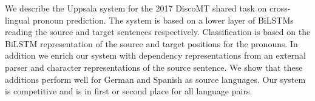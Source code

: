 We describe the Uppsala system for the 2017 DiscoMT shared task on cross-lingual pronoun prediction. The system is based on a lower layer of BiLSTMs reading the source and target sentences respectively. Classification is based on the BiLSTM representation of the source and target positions for the pronouns. In addition we enrich our system with dependency representations from an external parser and character representations of the source sentence. We show that these additions perform well for German and Spanish as source languages. Our system is competitive and is in first or second place for all language pairs.
